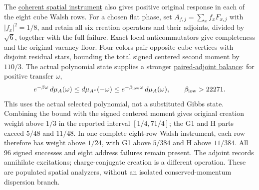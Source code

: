 The \href{https://github.com/FloatingPragma/observer-patch-holography/blob/main/model/particle_primary_coherent_odd_response/PROOF.md}{coherent spatial instrument}
also gives positive original response in each of the eight cube Walsh
rows. For a chosen flat phase, set $A_{f,j}=\sum_x f_xF_{x,j}$ with
$|f_x|^2=1/8$, and retain all six creation operators and their adjoints,
divided by $\sqrt6$, together with the full failure. Exact local
anticommutators give completeness and the original vacancy floor.
Four colors pair opposite cube vertices with disjoint residual stars,
bounding the total signed centered second moment by $110/3$.
The actual polynomial state supplies a stronger
\href{https://github.com/FloatingPragma/observer-patch-holography/blob/main/model/particle_primary_original_branch/PROOF.md}{paired-adjoint balance}:
for positive transfer $\omega$,
\[
 e^{-\beta\omega}\,d\mu_A(\omega)
 \le d\mu_{A^*}(-\omega)
 \le e^{-\beta_{\rm low}\omega}\,d\mu_A(\omega),
 \qquad \beta_{\rm low}>22271.
\]
This uses the actual selected polynomial, not a substituted Gibbs state.
Combining the bound with the signed centered moment gives original
creation weight above $1/3$ in the reported interval $[1/4,71/4]$;
the G1 and H parts exceed $5/48$ and $11/48$.
In one complete eight-row Walsh instrument, each row therefore has
weight above $1/24$, with G1 above $5/384$ and H above $11/384$.
All 96 signed successes and eight address failures remain present.
The adjoint records annihilate excitations; charge-conjugate creation
is a different operation. These are populated spatial analyzers,
without an isolated conserved-momentum dispersion branch.

